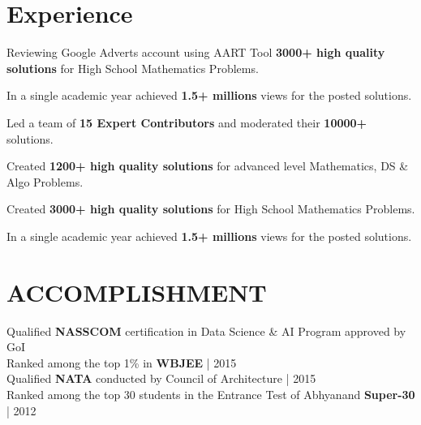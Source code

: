 \documentclass[]{plushcv}
\begin{document}
\section{Experience}
 \hspace{-0.25cm}
\begin{tightemize}
\item Reviewing Google Adverts account using AART Tool \textbf{3000+ high quality solutions} for High School Mathematics Problems.
\item In a single academic year achieved \textbf{1.5+ millions} views for the posted solutions.
\end{tightemize}

 \hspace{-0.25cm}
\begin{tightemize}
\item Led a team of \textbf{15 Expert Contributors} and moderated their \textbf{10000+} solutions.
\item Created \textbf{1200+ high quality solutions} for advanced level Mathematics, DS \& Algo Problems.
\end{tightemize}

 \hspace{-0.25cm}
\begin{tightemize}
\item Created \textbf{3000+ high quality solutions} for High School Mathematics Problems.
\item In a single academic year achieved \textbf{1.5+ millions} views for the posted solutions.
\end{tightemize}

\section{ACCOMPLISHMENT}
\textbullet{} Qualified \textbf{NASSCOM} certification in Data Science \& AI Program approved by GoI \\
\textbullet{} Ranked among the top 1\% in \textbf{WBJEE} | 2015\\
\textbullet{} Qualified \textbf{NATA} conducted by Council of Architecture | 2015
\\
\textbullet{} Ranked among the top 30 students in the Entrance Test of Abhyanand \textbf{Super-30} | 2012
\end{document}
